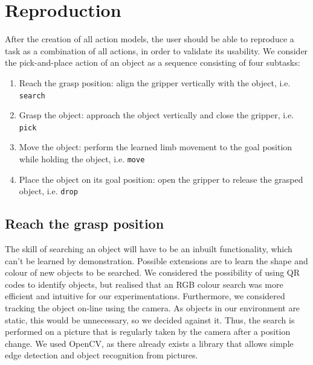 \section{Reproduction}
After the creation of all action models, the user should be able to reproduce a task as a combination of all actions, in order to validate its usability.
We consider the pick-and-place action of an object as a sequence consisting of four subtasks:
\begin{enumerate}
\item Reach the grasp position: align the gripper vertically with the object, i.e. \texttt{search}
\item Grasp the object: approach the object vertically and close the gripper, i.e. \texttt{pick}
\item Move the object: perform the learned limb movement to the goal position while holding the object, i.e. \texttt{move}
\item Place the object on its goal position: open the gripper to release the grasped object, i.e. \texttt{drop}
\end{enumerate}

\subsection{Reach the grasp position}\label{Object Search}
The skill of searching an object will have to be an inbuilt functionality, which can't be learned by demonstration. Possible extensions are to learn the shape and colour of new objects to be searched. We considered the possibility of using QR codes to identify objects, but realised that an RGB colour search was more efficient and intuitive for our experimentations. Furthermore, we considered tracking the object on-line using the camera. As objects in our environment are static, this would be unnecessary, so we decided against it. Thus, the search is performed on a picture that is regularly taken by the camera after a position change. 
We used OpenCV, as there already exists a library that allows simple edge detection and object recognition from pictures.

